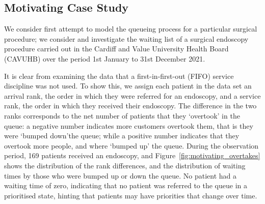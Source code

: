 \documentclass{article}
\begin{document}

\subsection{Motivating Case Study}\label{sec:casestudy}
We consider first attempt to model the queueing process for a particular
surgical procedure; we consider and investigate the waiting list of a surgical
endoscopy procedure carried out in the Cardiff and Value University Health Board
(CAVUHB) over the period 1st January to 31st December 2021.

It is clear from examining the data that a first-in-first-out (FIFO) service
discipline was not used. To show this, we assign each patient in the data set
an arrival rank, the order in which they were referred for an endoscopy, and a
service rank, the order in which they received their endoscopy. The difference
in the two ranks corresponds to the net number of patients that they `overtook'
in the queue: a negative number indicates more customers overtook them, that is
they were `bumped down'the queue; while a positive number indicates that they
overtook more people, and where `bumped up' the queue. During the observation
period, 169 patients received an endoscopy, and
Figure~\ref{fig:motivating_overtakes} shows the distribution of the rank
differences, and the distribution of waiting times by those who were bumped up
or down the queue. No patient had a waiting time of zero, indicating that no
patient was referred to the queue in a prioritised state, hinting that patients
may have priorities that change over time.
\end{document}
